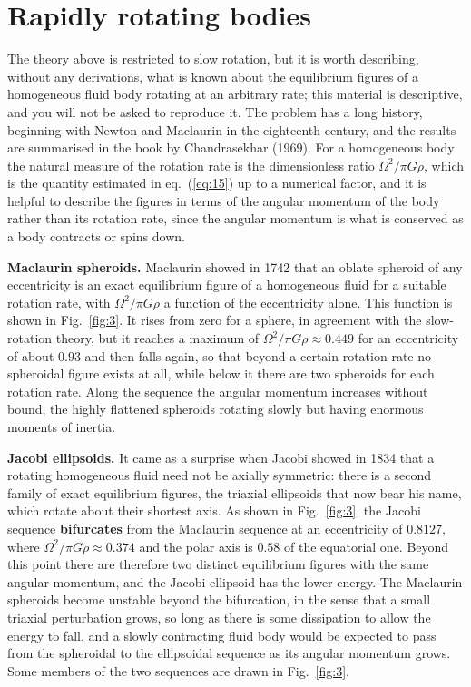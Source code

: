 \section*{Rapidly rotating bodies}
The theory above is restricted to slow rotation, but it is worth describing, without any derivations, what is known 
about the equilibrium figures of a homogeneous fluid body rotating at an arbitrary rate; this material is descriptive, 
and you will not be asked to reproduce it. The problem has a long history, beginning with Newton and Maclaurin in the 
eighteenth century, and the results are summarised in the book by Chandrasekhar (1969). For a homogeneous body the 
natural measure of the rotation rate is the dimensionless ratio $\Omega^{2}/\pi G\rho$, which is the quantity 
estimated in eq.~(\ref{eq:15}) up to a numerical factor, and it is helpful to describe the figures in terms of the 
angular momentum of the body rather than its rotation rate, since the angular momentum is what is conserved as a 
body contracts or spins down.

\textbf{Maclaurin spheroids.} Maclaurin showed in 1742 that an oblate spheroid of any eccentricity is an exact 
equilibrium figure of a homogeneous fluid for a suitable rotation rate, with $\Omega^{2}/\pi G\rho$ a function of the 
eccentricity alone. This function is shown in Fig.~\ref{fig:3}. It rises from zero for a sphere, in agreement with 
the slow-rotation theory, but it reaches a maximum of $\Omega^{2}/\pi G\rho\approx0.449$ for an eccentricity of about 
$0.93$ and then falls again, so that beyond a certain rotation rate no spheroidal figure exists at all, while below 
it there are two spheroids for each rotation rate. Along the sequence the angular momentum increases without 
bound, the highly flattened spheroids rotating slowly but having enormous moments of inertia.

\textbf{Jacobi ellipsoids.} It came as a surprise when Jacobi showed in 1834 that a rotating homogeneous fluid need 
not be axially symmetric: there is a second family of exact equilibrium figures, the triaxial ellipsoids that now 
bear his name, which rotate about their shortest axis. As shown in Fig.~\ref{fig:3}, the Jacobi sequence 
\textbf{bifurcates} from the Maclaurin sequence at an eccentricity of $0.8127$, where 
$\Omega^{2}/\pi G\rho\approx0.374$ and the polar axis is $0.58$ of the equatorial one. Beyond this point there are 
therefore two distinct equilibrium figures with the same angular momentum, and the Jacobi ellipsoid has the lower 
energy. The Maclaurin spheroids become unstable beyond the bifurcation, in the sense that a small triaxial 
perturbation grows, so long as there is some dissipation to allow the energy to fall, and a slowly contracting 
fluid body would be expected to pass from the spheroidal to the ellipsoidal sequence as its angular momentum grows. 
Some members of the two sequences are drawn in Fig.~\ref{fig:3}.

